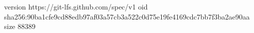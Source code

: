version https://git-lfs.github.com/spec/v1
oid sha256:90ba1cfe9cd88edb97af03a57cb3a522c0d75e19fe4169cdc7bb7f3ba2ae90aa
size 88389
